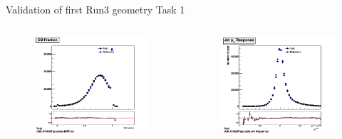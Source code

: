 \begin{frame}{Validation of first Run3 geometry Task 1}
    \begin{columns}
        \begin{column}{0.5\textwidth}
            \begin{figure}
                \centering
                \includegraphics[width = \textwidth]{812_1_EMFrac}
            \end{figure}
        \end{column}
        \begin{column}{0.5\textwidth}
            \begin{figure}
                \centering
                \includegraphics[width = \textwidth]{812_1_erhResponse}

\end{figure}
\end{column}
\end{columns}
\end{frame}
